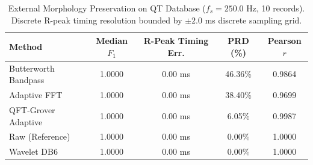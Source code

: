 \begin{table}[t]
\centering
\caption{External Morphology Preservation on QT Database ($f_s = 250.0$ Hz, 10 records). Discrete R-peak timing resolution bounded by $\pm 2.0$ ms discrete sampling grid.}
\label{tab:qtdb_morphology}
\begin{tabular}{lcccc}
\hline
\textbf{Method} & \textbf{Median $F_1$} & \textbf{R-Peak Timing Err.} & \textbf{PRD (\%)} & \textbf{Pearson $r$} \\
\hline
Butterworth Bandpass & 1.0000 & 0.00 ms & 46.36\% & 0.9864 \\
Adaptive FFT & 1.0000 & 0.00 ms & 38.40\% & 0.9699 \\
QFT-Grover Adaptive & 1.0000 & 0.00 ms & 6.05\% & 0.9987 \\
Raw (Reference) & 1.0000 & 0.00 ms & 0.00\% & 1.0000 \\
Wavelet DB6 & 1.0000 & 0.00 ms & 0.00\% & 1.0000 \\
\hline
\end{tabular}
\end{table}
